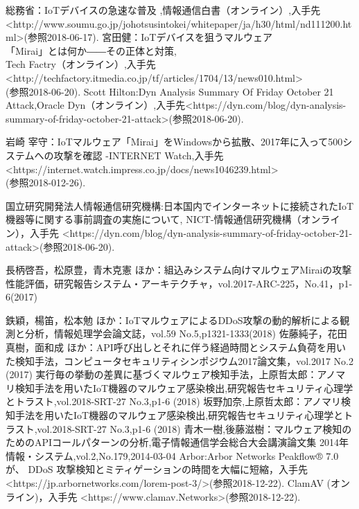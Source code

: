 
\begin{thebibliography}{10}
		総務省：IoTデバイスの急速な普及 ,情報通信白書（オンライン）,入手先\textless http://www.soumu.go.jp/johotsusintokei/whitepaper/ja/h30/html/nd111200.html\textgreater(参照2018-06-17).
        宮田健：IoTデバイスを狙うマルウェア\\「Mirai」とは何か――その正体と対策,\\Tech Factry（オンライン）,入手先\textless http:\slash\slash{}techfactory.itmedia.co.jp\slash{}tf\slash{}articles\slash{}1704\slash{}13\slash{}news010.html\textgreater\\(参照2018-06-20).
       Scott Hilton:Dyn Analysis Summary Of Friday October 21 Attack,Oracle Dyn（オンライン）,入手先\textless https:\slash\slash{}dyn.com\slash{}blog\slash{}dyn-analysis-summary-of-friday-october-21-attack\textgreater (参照2018-06-20).
    
       岩崎 宰守：IoTマルウェア「Mirai」をWindowsから拡散、2017年に入って500システムへの攻撃を確認 -INTERNET Watch,入手先\textless https:\slash\slash{}internet.watch.impress.co.jp\slash{}docs\slash{}news1046239.html\textgreater\\(参照2018-012-26).
    
        国立研究開発法人情報通信研究機構:日本国内でインターネットに接続されたIoT機器等に関する事前調査の実施について, NICT-情報通信研究機構（オンライン），入手先 \textless https:\slash\slash{}dyn.com\slash{}blog\slash{}dyn-analysis-summary-of-friday-october-21-attack\textgreater (参照2018-06-20).

        長柄啓吾，松原豊，青木克憲 ほか：組込みシステム向けマルウェアMiraiの攻撃性能評価，研究報告システム・アーキテクチャ，vol.2017-ARC-225，No.41，p1-6(2017)
    
        鉄穎，楊笛，松本勉 ほか：IoTマルウェアによるDDoS攻撃の動的解析による観測と分析，情報処理学会論文誌，vol.59 No.5,p1321-1333(2018)
        佐藤純子，花田真樹，面和成 ほか：API呼び出しとそれに伴う経過時間とシステム負荷を用いた検知手法，コンピュータセキュリティシンポジウム2017論文集，vol.2017 No.2 (2017)
        実行毎の挙動の差異に基づくマルウェア検知手法，上原哲太郎：アノマリ検知手法を用いたIoT機器のマルウェア感染検出,研究報告セキュリティ心理学とトラスト,vol.2018-SRT-27 No.3,p1-6 (2018)
        坂野加奈,上原哲太郎：アノマリ検知手法を用いたIoT機器のマルウェア感染検出,研究報告セキュリティ心理学とトラスト,vol.2018-SRT-27 No.3,p1-6 (2018)
         青木一樹,後藤滋樹：マルウェア検知のためのAPIコールパターンの分析,電子情報通信学会総合大会講演論文集 2014年 情報・システム,vol.2,No.179,2014-03-04
         Arbor:Arbor Networks Peakflow® 7.0 が、 DDoS 攻撃検知とミティゲーションの時間を大幅に短縮，入手先 \textless https:\slash\slash{}jp.arbornetworks.com\slash{}lorem-post-3\slash{}\textgreater (参照2018-12-22).
         ClamAV (オンライン)，入手先 \textless https:\slash\slash{}www.clamav.Networks\textgreater(参照2018-12-22).


\end{thebibliography}
